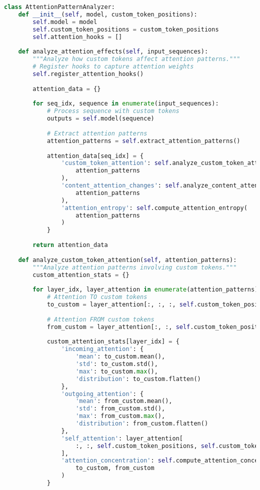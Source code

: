 \begin{lstlisting}[language=Python, caption=Attention pattern analysis for custom token design]
class AttentionPatternAnalyzer:
    def __init__(self, model, custom_token_positions):
        self.model = model
        self.custom_token_positions = custom_token_positions
        self.attention_hooks = []
        
    def analyze_attention_effects(self, input_sequences):
        """Analyze how custom tokens affect attention patterns."""
        # Register hooks to capture attention weights
        self.register_attention_hooks()
        
        attention_data = {}
        
        for seq_idx, sequence in enumerate(input_sequences):
            # Process sequence with custom tokens
            outputs = self.model(sequence)
            
            # Extract attention patterns
            attention_patterns = self.extract_attention_patterns()
            
            attention_data[seq_idx] = {
                'custom_token_attention': self.analyze_custom_token_attention(
                    attention_patterns
                ),
                'content_attention_changes': self.analyze_content_attention_changes(
                    attention_patterns
                ),
                'attention_entropy': self.compute_attention_entropy(
                    attention_patterns
                )
            }
        
        return attention_data
    
    def analyze_custom_token_attention(self, attention_patterns):
        """Analyze attention patterns involving custom tokens."""
        custom_attention_stats = {}
        
        for layer_idx, layer_attention in enumerate(attention_patterns):
            # Attention TO custom tokens
            to_custom = layer_attention[:, :, :, self.custom_token_positions]
            
            # Attention FROM custom tokens
            from_custom = layer_attention[:, :, self.custom_token_positions, :]
            
            custom_attention_stats[layer_idx] = {
                'incoming_attention': {
                    'mean': to_custom.mean(),
                    'std': to_custom.std(),
                    'max': to_custom.max(),
                    'distribution': to_custom.flatten()
                },
                'outgoing_attention': {
                    'mean': from_custom.mean(),
                    'std': from_custom.std(),
                    'max': from_custom.max(),
                    'distribution': from_custom.flatten()
                },
                'self_attention': layer_attention[
                    :, :, self.custom_token_positions, self.custom_token_positions
                ],
                'attention_concentration': self.compute_attention_concentration(
                    to_custom, from_custom
                )
            }
        

\end{lstlisting}
